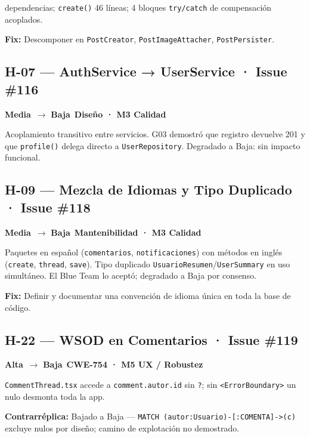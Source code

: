 \documentclass[10pt,a4paper]{article}
\newcommand{\code}[1]{\nolinkurl{#1}}
\newcommand{\badgeAlta}{\colorbox{orange!20}{\textcolor{orange!90!black}{\textbf{\footnotesize Alta}}}}
\newcommand{\badgeMedia}{\colorbox{yellow!35}{\textcolor{brown!90!black}{\textbf{\footnotesize Media}}}}
\newcommand{\badgeBaja}{\colorbox{blue!15}{\textcolor{blue!80!black}{\textbf{\footnotesize Baja}}}}
\begin{document}
 dependencias; \code{create()} 46 líneas; 4 bloques \code{try/catch} de compensación acoplados.\par
\noindent\textbf{Fix:} Descomponer en \code{PostCreator}, \code{PostImageAttacher}, \code{PostPersister}.

\vspace{0.5em}
\subsection*{H-07 — AuthService → UserService · Issue \#116}
\badgeMedia\ $\rightarrow$ \badgeBaja\ \quad \textbf{Diseño · M3 Calidad}

\noindent Acoplamiento transitivo entre servicios. G03 demostró que registro devuelve 201 y que \code{profile()} delega directo a \code{UserRepository}. Degradado a Baja: sin impacto funcional.

\vspace{0.5em}
\subsection*{H-09 — Mezcla de Idiomas y Tipo Duplicado · Issue \#118}
\badgeMedia\ $\rightarrow$ \badgeBaja\ \quad \textbf{Mantenibilidad · M3 Calidad}

\noindent Paquetes en español (\code{comentarios}, \code{notificaciones}) con métodos en inglés (\code{create}, \code{thread}, \code{save}). Tipo duplicado \code{UsuarioResumen}/\code{UserSummary} en uso simultáneo. El Blue Team lo aceptó; degradado a Baja por consenso.\par
\noindent\textbf{Fix:} Definir y documentar una convención de idioma única en toda la base de código.

\vspace{0.5em}
\subsection*{H-22 — WSOD en Comentarios · Issue \#119}
\badgeAlta\ $\rightarrow$ \badgeBaja\ \quad \textbf{CWE-754 · M5 UX / Robustez}

\noindent \code{CommentThread.tsx} accede a \code{comment.autor.id} sin \code{?}; sin \code{<ErrorBoundary>} un nulo desmonta toda la app.\par
\noindent\textbf{Contrarréplica:} Bajado a Baja — \code{MATCH (autor:Usuario)-[:COMENTA]->(c)} excluye nulos por diseño; camino de explotación no demostrado.

\vspace{0.5em}
\end{document}
